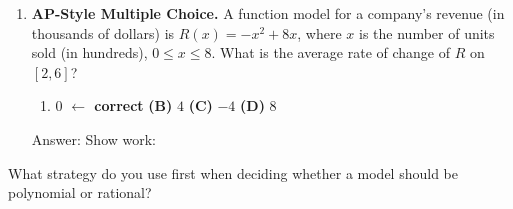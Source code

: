 \documentclass[10pt]{article}
\begin{document}
\begin{enumerate}[itemsep=18pt]
\begin{enumerate}[label=(\alph*), itemsep=8pt]
        \item Compute $C(0.5)$, $C(1)$, $C(2.5)$, and $C(4)$.

              \vspace{0.06in}
              $C(0.5) = $  \quad $C(1) = $  \quad $C(2.5) = $  \quad $C(4) = $ 

        \item Is $C(t)$ a polynomial function? Explain.

              \vspace{0.06in}
      \end{enumerate}

\item \textbf{AP-Style Multiple Choice.} A function model for a company's revenue (in thousands
      of dollars) is $R(x) = -x^2 + 8x$, where $x$ is the number of units sold (in hundreds),
      $0 \leq x \leq 8$. What is the average rate of change of $R$ on $[2, 6]$?

      \medskip
      \begin{enumerate}[label=(\Alph*), itemsep=3pt]
        \item $0$ \textcolor{keyred}{\textbf{$\leftarrow$ correct}} \qquad \textbf{(B)} $4$ \qquad \textbf{(C)} $-4$ \qquad \textbf{(D)} $8$
      \end{enumerate}

      \vspace{0.06in}
      Answer:  \quad Show work:

      \vspace{0.08in}

\end{enumerate}

\begin{reflectionbox}
What strategy do you use first when deciding whether a model should be polynomial or rational?
\end{reflectionbox}
\end{document}
